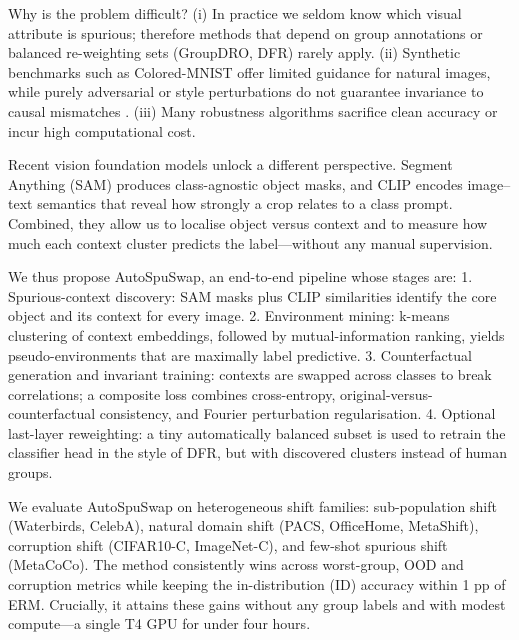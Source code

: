 \documentclass{article}
\begin{document}
Why is the problem difficult? (i) In practice we seldom know which visual attribute is spurious; therefore methods that depend on group annotations or balanced re-weighting sets (GroupDRO, DFR) rarely apply. (ii) Synthetic benchmarks such as Colored-MNIST offer limited guidance for natural images, while purely adversarial or style perturbations do not guarantee invariance to causal mismatches \cite{fridovichkeil-2022-models}. (iii) Many robustness algorithms sacrifice clean accuracy or incur high computational cost.

Recent vision foundation models unlock a different perspective. Segment Anything (SAM) produces class-agnostic object masks, and CLIP encodes image–text semantics that reveal how strongly a crop relates to a class prompt. Combined, they allow us to localise object versus context and to measure how much each context cluster predicts the label—without any manual supervision.

We thus propose AutoSpuSwap, an end-to-end pipeline whose stages are: 1. Spurious-context discovery: SAM masks plus CLIP similarities identify the core object and its context for every image. 2. Environment mining: k-means clustering of context embeddings, followed by mutual-information ranking, yields pseudo-environments that are maximally label predictive. 3. Counterfactual generation and invariant training: contexts are swapped across classes to break correlations; a composite loss combines cross-entropy, original-versus-counterfactual consistency, and Fourier perturbation regularisation. 4. Optional last-layer reweighting: a tiny automatically balanced subset is used to retrain the classifier head in the style of DFR, but with discovered clusters instead of human groups.

We evaluate AutoSpuSwap on heterogeneous shift families: sub-population shift (Waterbirds, CelebA), natural domain shift (PACS, OfficeHome, MetaShift), corruption shift (CIFAR10-C, ImageNet-C), and few-shot spurious shift (MetaCoCo). The method consistently wins across worst-group, OOD and corruption metrics while keeping the in-distribution (ID) accuracy within 1 pp of ERM. Crucially, it attains these gains without any group labels and with modest compute—a single T4 GPU for under four hours.
\end{document}
